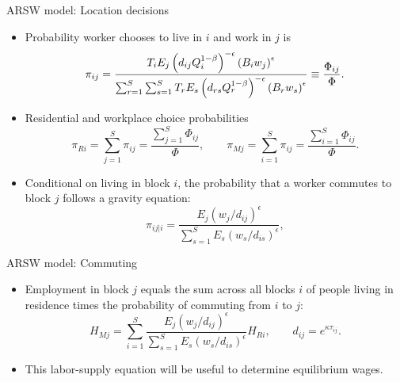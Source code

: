 \documentclass[11pt,notes=hide,aspectratio=169]{beamer}
\begin{document}
\begin{frame}{ARSW model: Location decisions}
\begin{itemize}
\item Probability worker chooses to live in $i$ and work in $j$ is
\begin{equation*} \label{eq:com_prob}
\pi _{ij}= \frac{T_{i} E_{j} \left( d_{ij}
Q_{i}^{1-\beta} \right)^{-\epsilon} \left( B_{i} w_{j} \right)^{\epsilon}}{%
\sum_{r=1}^{S} \sum_{s=1}^{S} T_{r} E_{s} \left( d_{rs} Q_{r}^{1-\beta}
\right)^{-\epsilon} \left( B_{r} w_{s} \right)^{\epsilon}} \equiv \frac{\Phi_{ij}}{\Phi} .
\end{equation*}
\item Residential and workplace choice probabilities
\begin{equation*} \label{eq:ch_prob}
\pi_{Ri} = \sum_{j=1}^{S} \pi_{ij} = \frac{\sum_{j=1}^{S} \Phi_{ij}}{\Phi}, \qquad  \pi_{Mj} = \sum_{i=1}^{S} \pi_{ij} = \frac{\sum_{i=1}^{S} \Phi_{ij}}{\Phi}.
\end{equation*}
\item Conditional on living in block $i$, the probability that a worker commutes to block $j$ follows a gravity equation:
\begin{equation*}
\pi _{ij|i}=\frac{ E_{j} \left( w_{j} / d_{ij} \right)^{\epsilon}}{
\sum_{s=1}^{S} E_{s} \left( w_{s} / d_{is} \right)^{\epsilon}},
\end{equation*}
\end{itemize}
\end{frame}
\begin{frame}{ARSW model: Commuting }
\begin{itemize}
\item Employment in block $j$ equals the sum across all blocks $i$ of people living in residence times the probability of commuting from $i$ to $j$:
\begin{equation*} \label{eq:wbo}
H_{Mj}=\sum_{i=1}^{S} \frac{E_{j}\left(
w_{j}/d_{ij}\right) ^{\epsilon }}{\sum_{s=1}^{S}E_{s}\left( w_{s}/d_{is}\right)
^{\epsilon }} H_{Ri}, \qquad d_{ij} = e^{\kappa \tau_{ij}}.
\end{equation*} \smallskip
\item This labor-supply equation will be useful to determine equilibrium wages. 
\end{itemize}
\end{frame}
\end{document}
